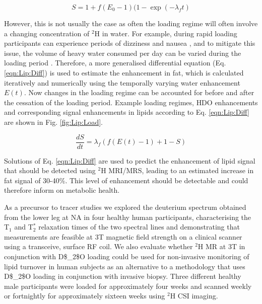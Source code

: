\begin{equation}
    S = 1 + f(E_0 - 1)(1 - \exp(-\lambda_ft)
    \label{eqn:Lip:Load}
\end{equation}

However, this is not usually the case as often the loading regime will often involve a changing concentration of $^2$H in water. For example, during rapid loading participants can experience periods of dizziness and nausea \cite{Money1974HeavyAlcohol}, and to mitigate this issue, the volume of heavy water consumed per day can be varied during the loading period \cite{Strawford2004AdiposeO, Cocking2023DeuteriumDosing}. Therefore, a more generalised differential equation (Eq. \ref{eqn:Lip:Diff}) is used to estimate the enhancement in fat, which is calculated iteratively and numerically using the temporally varying water enhancement $E(t)$. Now changes in the loading regime can be accounted for before and after the cessation of the loading period. Example loading regimes, \ac{HDO} enhancements and corresponding signal enhancements in lipids according to Eq. \ref{eqn:Lip:Diff} are shown in Fig. \ref{fig:Lip:Load}.

\begin{equation}
    \frac{dS}{dt} = \lambda_f(f(E(t)-1)+1-S)
    \label{eqn:Lip:Diff}
\end{equation}



Solutions of Eq. \ref{eqn:Lip:Diff} are used to predict the enhancement of lipid signal that should be detected using $^2$H \ac{MRI}/\ac{MRS}, leading to an estimated increase in fat signal of 30-40\%. This level of enhancement should be detectable and could therefore inform on metabolic health. 
 
As a precursor to tracer studies we explored the deuterium spectrum obtained from the lower leg at \ac{NA} in four healthy human participants, characterising the T$_1$ and T$_2^*$ relaxation times of the two spectral lines and demonstrating that measurements are feasible at 3T magnetic field strength on a clinical scanner using a transceive, surface \ac{RF} coil. We also evaluate whether $^2$H MR at 3T in conjunction with \ac{D$_2$O} loading could be used for non-invasive monitoring of lipid turnover in human subjects as an alternative to a methodology that uses \ac{D$_2$O} loading in conjunction with invasive biopsy. Three different healthy male participants were loaded for approximately four weeks and scanned weekly or fortnightly for approximately sixteen weeks using $^2$H \ac{CSI} imaging.

